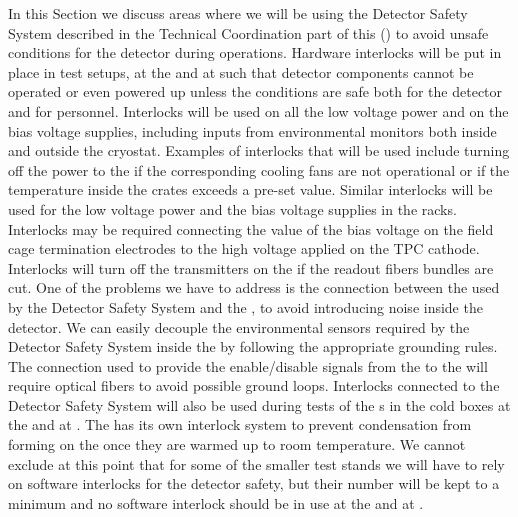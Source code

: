 In this Section we discuss areas where we will be using
the Detector Safety System described in the Technical
Coordination part of this  ()
to avoid unsafe conditions for the  detector 
during operations. Hardware interlocks will be put in place
in test setups, at the  and at \surf such that
detector components cannot be operated or even powered up
unless the conditions are safe
both for the detector and for personnel. Interlocks will be
used on all the low voltage power and on the bias voltage 
supplies, including inputs from environmental monitors both
inside and outside the cryostat. Examples of interlocks that
will be used include turning off the power to the 
if the corresponding cooling fans are not operational or
if the temperature inside the crates exceeds a pre-set value.
Similar interlocks will be used for the low voltage power
and the bias voltage supplies in the  racks.
Interlocks may be required connecting the value of the 
bias voltage on the field cage termination electrodes to the
high voltage applied on the TPC cathode. Interlocks will turn 
off the transmitters on the  if the readout fibers 
bundles are cut. One of the problems we have to address is 
the connection between the  used by the Detector 
Safety System and the , to avoid introducing noise 
inside the detector. We can easily decouple the environmental 
sensors required by the Detector Safety System inside the 
 by following the appropriate grounding rules. 
The connection used to provide the enable/disable signals 
from the  to the  will require optical 
fibers to avoid possible ground loops. Interlocks connected
to the Detector Safety System will also be used during tests 
of the s in the cold boxes at the  and 
at \surf. The  has its own interlock system to
prevent condensation from forming on the  once
they are warmed up to room temperature. We cannot exclude at
this point that for some of the smaller test stands we will 
have to rely on software interlocks for the detector safety,
but their number will be kept to a minimum and no software
interlock should be in use at the  and at \surf.

